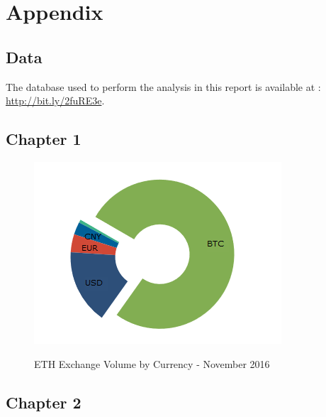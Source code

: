 \documentclass[11pt]{report}
\begin{document}
	
	
	\nocite{*}

\appendix
\chapter*{Appendix}
\section*{Data}
The database used to perform the analysis in this report is available at : \newline \url{http://bit.ly/2fuRE3e}.

\section*{Chapter 1}

\begin{figure}[!h]
\centering
\includegraphics[scale=1]{Appendix/Volume}\medbreak
\caption{ETH Exchange Volume by Currency - November 2016} \cite{CRYPTOCOMPARE}
\label{VOLUME}
\end{figure}

\clearpage
\section*{Chapter 2}
\end{document}
